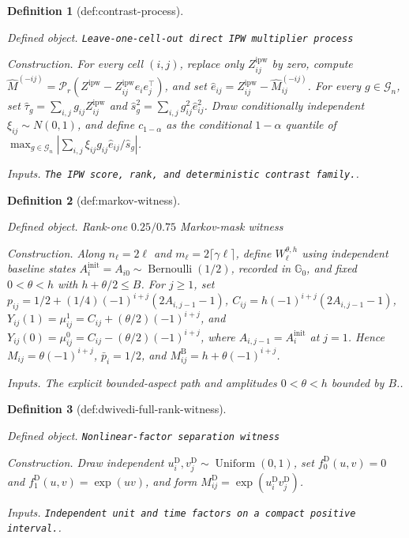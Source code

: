 \documentclass{article}
\newtheorem{definition}{Definition}
\begin{document}
\begin{definition}[def:contrast-process]\label{def:contrast-process}
\par\smallskip\noindent\emph{Defined object.} \texttt{Leave-\allowbreak{}one-\allowbreak{}cell-\allowbreak{}out direct IPW multiplier process}
\par\smallskip\noindent\emph{Construction.} For every cell \( (i,j)\), replace only \(Z^{\mathrm{ipw}}_{ij}\) by zero, compute \(\widehat M^{(-ij)}=\mathcal P_r(Z^{\mathrm{ipw}}-Z^{\mathrm{ipw}}_{ij}e_ie_j^\top)\), and set \(\widehat e_{ij}=Z^{\mathrm{ipw}}_{ij}-\widehat M^{(-ij)}_{ij}\). For every \(g\in\mathcal G_n\), set \(\widehat\tau_g=\sum_{i,j}g_{ij}Z^{\mathrm{ipw}}_{ij}\) and \(\widehat s_g^2=\sum_{i,j}g_{ij}^2\widehat e_{ij}^2\). Draw conditionally independent \(\xi_{ij}\sim N(0,1)\), and define \(c_{1-\alpha}\) as the conditional \(1-\alpha\) quantile of \(\max_{g\in\mathcal G_n}|\sum_{i,j}\xi_{ij}g_{ij}\widehat e_{ij}/\widehat s_g|\).
\par\smallskip\noindent\emph{Inputs.} \texttt{The IPW score,\allowbreak{} rank,\allowbreak{} and deterministic contrast family.}.
\end{definition}

\begin{definition}[def:markov-witness]\label{def:markov-witness}
\par\smallskip\noindent\emph{Defined object.} Rank-one \(0.25/0.75\) Markov-mask witness
\par\smallskip\noindent\emph{Construction.} Along \(n_\ell=2\ell\) and \(m_\ell=2\lceil\gamma\ell\rceil\), define \(W^{\theta,h}_\ell\) using independent baseline states \(A^{\mathrm{init}}_i=A_{i0}\sim\operatorname{Bernoulli}(1/2)\), recorded in \(\mathbb G_0\), and fixed \(0<\theta<h\) with \(h+\theta/2\le B\). For \(j\ge1\), set \(p_{ij}=1/2+(1/4)(-1)^{i+j}(2A_{i,j-1}-1)\), \(C_{ij}=h(-1)^{i+j}(2A_{i,j-1}-1)\), \(Y_{ij}(1)=\mu^1_{ij}=C_{ij}+(\theta/2)(-1)^{i+j}\), and \(Y_{ij}(0)=\mu^0_{ij}=C_{ij}-(\theta/2)(-1)^{i+j}\), where \(A_{i,j-1}=A^{\mathrm{init}}_i\) at \(j=1\). Hence \(M_{ij}=\theta(-1)^{i+j}\), \(\bar p_i=1/2\), and \(M^{\mathrm B}_{ij}=h+\theta(-1)^{i+j}\).
\par\smallskip\noindent\emph{Inputs.} The explicit bounded-aspect path and amplitudes \(0<\theta<h\) bounded by \(B\)..
\end{definition}

\begin{definition}[def:dwivedi-full-rank-witness]\label{def:dwivedi-full-rank-witness}
\par\smallskip\noindent\emph{Defined object.} \texttt{Nonlinear-\allowbreak{}factor separation witness}
\par\smallskip\noindent\emph{Construction.} Draw independent \(u^{\mathrm D}_i,v^{\mathrm D}_j\sim\operatorname{Uniform}(0,1)\), set \(f^{\mathrm D}_0(u,v)=0\) and \(f^{\mathrm D}_1(u,v)=\exp(uv)\), and form \(M^{\mathrm D}_{ij}=\exp(u^{\mathrm D}_iv^{\mathrm D}_j)\).
\par\smallskip\noindent\emph{Inputs.} \texttt{Independent unit and time factors on a compact positive interval.}.
\end{definition}
\end{document}
